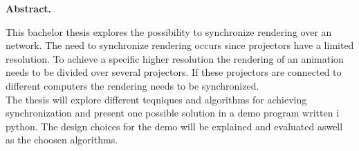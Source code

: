 \mbox{}
\vspace{3cm}
\begin{center}
\begin{minipage}[center]{0.80\textwidth}

\begin{center}
{\normalsize \textbf{Abstract.}}
\end{center}
This bachelor thesis explores the possibility to synchronize rendering over an network. The need to synchronize rendering occurs since projectors have a limited resolution. To achieve a specific higher resolution the rendering of an animation needs to be divided over several projectors. If these projectors are connected to different computers the rendering needs to be synchronized. 
\\

The thesis will explore different teqniques and algorithms for achieving synchronization and present one possible solution in a demo program written i python. The design choices for the demo will be explained and evaluated aswell as the choosen algorithms. 
\end{minipage}
\end{center}
